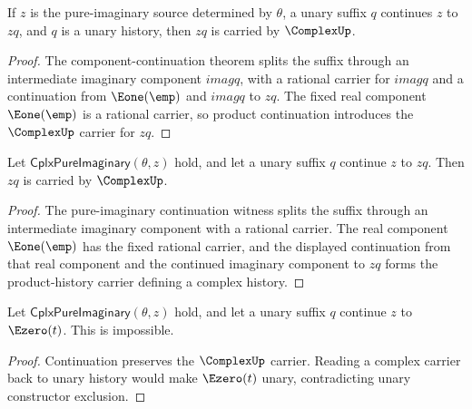 \begin{theorem}
\label{thm:cplx-pure-imaginary-continuation-complex-carrier}
If \(z\) is the pure-imaginary source determined by \(\theta\), a unary suffix
\(q\) continues \(z\) to \(zq\), and \(q\) is a unary history, then \(zq\) is
carried by \(\ComplexUp\).
\end{theorem}
\begin{proof}
The component-continuation theorem splits the suffix through an intermediate
imaginary component \(imagq\), with a rational carrier for \(imagq\) and a
continuation from \(\Eone(\emp)\) and \(imagq\) to \(zq\). The fixed real
component \(\Eone(\emp)\) is a rational carrier, so product continuation
introduces the \(\ComplexUp\) carrier for \(zq\).
\end{proof}

\begin{theorem}
\label{thm:cplx-pure-imaginary-component-continuation-complex-carrier}
Let $\mathsf{CplxPureImaginary}(\theta,z)$ hold, and let a unary suffix $q$
continue $z$ to $zq$. Then $zq$ is carried by $\ComplexUp$.
\end{theorem}
\begin{proof}
The pure-imaginary continuation witness splits the suffix through an
intermediate imaginary component with a rational carrier. The real component
$\Eone(\emp)$ has the fixed rational carrier, and the displayed continuation
from that real component and the continued imaginary component to $zq$ forms
the product-history carrier defining a complex history.
\end{proof}

\begin{theorem}
\label{thm:cplx-pure-imaginary-continuation-e0-result-absurd}
Let $\mathsf{CplxPureImaginary}(\theta,z)$ hold, and let a unary suffix $q$
continue $z$ to $\Ezero(t)$. This is impossible.
\end{theorem}
\begin{proof}
Continuation preserves the \(\ComplexUp\) carrier. Reading a complex carrier
back to unary history would make $\Ezero(t)$ unary, contradicting unary
constructor exclusion.
\end{proof}

